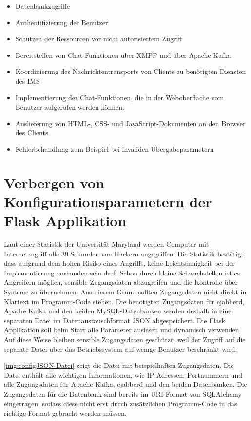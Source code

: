 \documentclass[a4paper,titlepage,halfparskip,12pt]{scrreprt}
\begin{document}
\begin{onehalfspacing}
\begin{itemize}
\item Datenbankzugriffe
\item Authentifizierung der Benutzer
\item Schützen der Ressourcen vor nicht autorisiertem Zugriff
\item Bereitstellen von Chat-Funktionen über \ac{XMPP} und über Apache Kafka
\item Koordinierung des Nachrichtentransports von Clients zu benötigten Diensten des \ac{IMS}
\item Implementierung der Chat-Funktionen, die in der Weboberfläche vom Benutzer aufgerufen werden können.
\item Auslieferung von \ac{HTML}-, \ac{CSS}- und JavaScript-Dokumenten an den Browser des Clients
\item Fehlerbehandlung zum Beispiel bei invaliden Übergabeparametern
\end{itemize}


\section{Verbergen von Konfigurationsparametern der Flask Applikation}

Laut einer Statistik der Universität Maryland \cite{securityStatisticWebSites} werden Computer mit Internetzugriff alle 39 Sekunden von Hackern angegriffen. Die Statistik bestätigt, dass aufgrund dem hohen Risiko eines Angriffs, keine Leichtsinnigkeit bei der Implementierung vorhanden sein darf. Schon durch kleine Schwachstellen ist es Angreifern möglich, sensible Zugangsdaten abzugreifen und die Kontrolle über Systeme zu übernehmen. Aus diesem Grund sollten Zugangsdaten nicht direkt in Klartext im Programm-Code stehen. Die benötigten Zugangsdaten für ejabberd, Apache Kafka und den beiden MySQL-Datenbanken werden deshalb in einer separaten Datei im Datenaustauschformat \acs{JSON} abgespeichert. Die Flask Applikation soll beim Start alle Parameter auslesen und dynamisch verwenden. Auf diese Weise bleiben sensible Zugangsdaten geschützt, weil der Zugriff auf die separate Datei über das Betriebssystem auf wenige Benutzer beschränkt wird.

\autoref{img:configJSON-Datei} zeigt die Datei mit beispielhaften Zugangsdaten. Die Datei enthält alle wichtigen Informationen, wie IP-Adressen, Portnummern und alle Zugangsdaten für Apache Kafka, ejabberd und den beiden Datenbanken. Die Zugangsdaten für die Datenbank sind bereits im \acs{URI}-Format von SQLAlchemy eingetragen, sodass diese nicht erst durch zusätzlichen Programm-Code in das richtige Format gebracht werden müssen.


\end{onehalfspacing}
\end{document}
